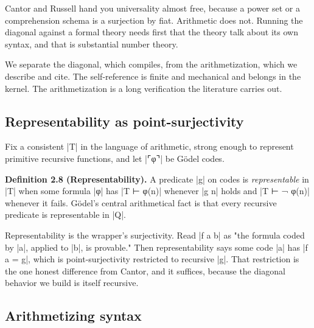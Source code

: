 \documentclass{memoir}
\begin{document}
Cantor and Russell hand you universality almost free, because a power set or a
comprehension schema is a surjection by fiat. Arithmetic does not. Running the
diagonal against a formal theory needs first that the theory talk about its own
syntax, and that is substantial number theory.

We separate the diagonal, which compiles, from the arithmetization, which we
describe and cite. The self-reference is finite and mechanical and belongs in
the kernel. The arithmetization is a long verification the literature carries
out.



\subsection{Representability as point-surjectivity}\label{Two--Schemas--of--Impossibility-005F-005F-005F--Machine--Checked--Limits--of--Trustworthy--Machine--Learning-005F-005F-005F--and--Why--They--Tighten--with--Capability----The--Classical--Limits----G-005F-005F-005Fdel-005F-005F-005Fs--first--incompleteness--theorem----Representability--as--point--surjectivity}

Fix a consistent \LeanVerb|T| in the language of arithmetic, strong enough to represent
primitive recursive functions, and let \LeanVerb|⌜φ⌝| be Gödel codes.

\textbf{Definition 2.8 (Representability).} A predicate \LeanVerb|g| on codes is \emph{representable} in
\LeanVerb|T| when some formula \LeanVerb|φ| has \LeanVerb|T ⊢ φ(n)| whenever \LeanVerb|g n| holds and \LeanVerb|T ⊢ ¬ φ(n)|
whenever it fails. Gödel's central arithmetical fact is that every recursive
predicate is representable in \LeanVerb|Q|.

Representability is the wrapper's surjectivity. Read \LeanVerb|f a b| as "the formula
coded by \LeanVerb|a|, applied to \LeanVerb|b|, is provable." Then representability says some code
\LeanVerb|a| has \LeanVerb|f a = g|, which is point-surjectivity restricted to recursive \LeanVerb|g|. That
restriction is the one honest difference from Cantor, and it suffices, because
the diagonal behavior we build is itself recursive.



\subsection{Arithmetizing syntax}\label{Two--Schemas--of--Impossibility-005F-005F-005F--Machine--Checked--Limits--of--Trustworthy--Machine--Learning-005F-005F-005F--and--Why--They--Tighten--with--Capability----The--Classical--Limits----G-005F-005F-005Fdel-005F-005F-005Fs--first--incompleteness--theorem----Arithmetizing--syntax}
\end{document}
